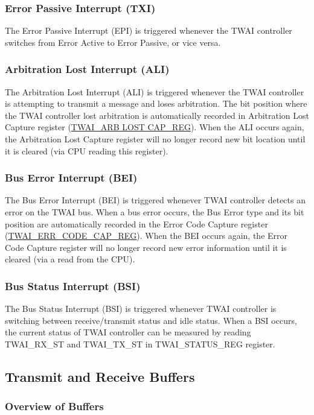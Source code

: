 \documentclass[main\_\_EN.tex]{subfiles}
\begin{document}
\subsubsection{Error Passive Interrupt (TXI)}
The Error Passive Interrupt (EPI) is triggered whenever the TWAI controller switches from Error Active to Error Passive, or vice versa.

\subsubsection{Arbitration Lost Interrupt (ALI)}
The Arbitration Lost Interrupt (ALI) is triggered whenever the TWAI controller is attempting to transmit a message and loses arbitration. The bit position where the TWAI controller lost arbitration is automatically recorded in Arbitration Lost Capture register (\hyperref[regdesc:TWAIARB LOST CAPREG]{TWAI\_ARB LOST CAP\_REG}). When the ALI occurs again, the Arbitration Lost Capture register will no longer record new bit location until it is cleared (via CPU reading this register).

\subsubsection{Bus Error Interrupt (BEI)}
The Bus Error Interrupt (BEI) is triggered whenever TWAI controller detects an error on the TWAI bus. When a bus error occurs, the Bus Error type and its bit position are automatically recorded in the Error Code Capture register (\hyperref[regdesc:TWAIERRCODECAPREG]{TWAI\_ERR\_CODE\_CAP\_REG}). When the BEI occurs again, the Error Code Capture register will no longer record new error information until it is cleared (via a read from the CPU).

\subsubsection{Bus Status Interrupt (BSI)}
The Bus Status Interrupt (BSI) is triggered whenever TWAI controller is switching between receive/transmit status and idle status. When a BSI occurs, the current status of TWAI controller can be measured by reading TWAI\_RX\_ST and TWAI\_TX\_ST in TWAI\_STATUS\_REG register.

\subsection{Transmit and Receive Buffers}
\subsubsection{Overview of Buffers}
\end{document}
